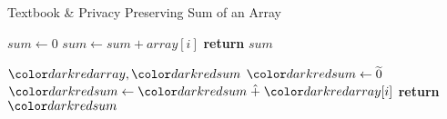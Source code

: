 \begin{algorithm}[H]
\caption{Textbook \& Privacy Preserving Sum of an Array}\label{a:sum}
\begin{algorithmic}[1]
\renewcommand{\algorithmicrequire}{\textbf{Private Vars:}}

    \State $sum  \gets 0$
        \State $sum \gets sum + array[i]$
    \EndFor
    \State \textbf{return} {$sum$}
\EndProcedure

\begin{spacing}{0.5}
\end{spacing}

\Require $\red{array}, \red{sum}$
    \State $\red{sum} \gets \enc{0}$
        \State $\red{sum} \gets \red{sum} \hplus \red{array}[i]$
    \EndFor
    \State \textbf{return} {$\red{sum}$}
\EndProcedure

\end{algorithmic}
\end{algorithm}
